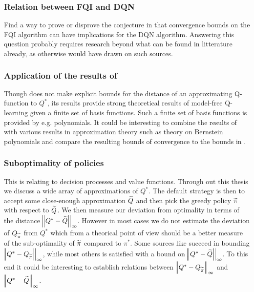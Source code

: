 \subsubsection{Relation between FQI and DQN}
Find a way to prove or disprove the conjecture in  that
convergence bounds on the FQI algorithm can have implications for the 
DQN algorithm.
Answering this question probably requires research beyond what can be
found in litterature already, as otherwise  would have
drawn on such sources.

\subsubsection{Application of the results of }
Though  does not make explicit bounds for the distance of an approximating
Q-function to $Q^*$,
its results provide strong theoretical results
of model-free Q-learning given a finite set of basis functions. 
Such a finite set of basis functions is provided by e.g.
polynomials. It could be interesting to combine the results of 
with various results in approximation theory such as theory on Bernstein
polynomials and compare the resulting bounds of convergence to the bounds in
.

\subsubsection{Suboptimality of policies}
This is relating to decision processes and value functions.
Through out this thesis we discuss a wide array of
approximations of $Q^*$.
The default strategy is then to accept some close-enough approximation $\widetilde{Q}$
and then pick the greedy policy $\widetilde{\pi}$ with respect to $\widetilde{Q}$.
We then measure our deviation from optimality in terms of the distance
$\norm{Q^* - \widetilde{Q}}_\infty$.
However in most cases we do not estimate the deviation of
$Q_{\widetilde{\pi}}$ from $Q^*$ which from a theorical point of view should be
a better measure of the sub-optimality of $\widetilde{\pi}$ compared to $\pi^*$.
Some sources like  succeed in bounding
$\norm{Q^* - Q_{\widetilde{\pi}}}_\infty$,
while most others is satisfied with a bound on $\norm{Q^* - \widetilde{Q}}_\infty$.
To this end it could be interesting to establish relations
between $\norm{Q^* - Q_{\widetilde{\pi}}}_\infty$ and $\norm{Q^* - \widetilde{Q}}_\infty$.

